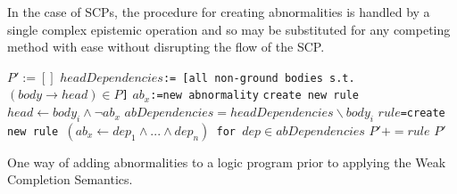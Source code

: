\documentclass{article}
\begin{document}
In the case of SCPs, the procedure for creating abnormalities is handled by a single complex epistemic operation and so may be substituted for any competing method with ease without disrupting the flow of the SCP.



\begin{algorithm}
\begin{algorithmic}[1]
\State \texttt{$P':=[]$}
\State \texttt{$headDependencies$:= [all non-ground bodies s.t.$(body \rightarrow head) \in P$]}
\State \texttt{$ab_{x}$:=new abnormality} 
\State \texttt{create new rule $head \leftarrow body_i \land \lnot ab_x$} 
\State \texttt {$abDependencies = headDependencies \backslash body_i$}
\State \texttt{$rule$=create new rule $(ab_x \leftarrow dep_1 \land ... \land dep_n)$ for $dep \in abDependencies$}
\State $P'+=rule$
\EndFor
\EndFor
\State \Return $P'$
\EndFunction
\end{algorithmic}
\caption{One way of adding abnormalities to a logic program prior to applying the Weak Completion Semantics.}
\label{alg:addAbnormalities}
\end{algorithm}
\end{document}
